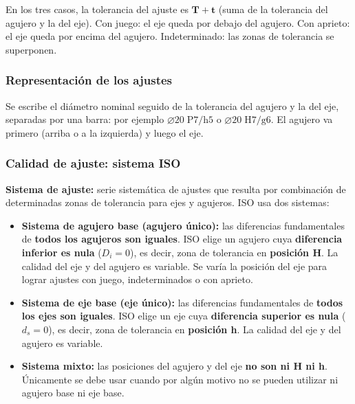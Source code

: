 \documentclass[12pt,a4paper]{article}
\begin{document}
\begin{aviso}
	En los tres casos, la tolerancia del ajuste es $\mathbf{T + t}$ (suma de la
	tolerancia del agujero y la del eje). Con juego: el eje queda por debajo del
	agujero. Con aprieto: el eje queda por encima del agujero. Indeterminado: las
	zonas de tolerancia se superponen.
\end{aviso}

\subsubsection{Representación de los ajustes}
Se escribe el diámetro nominal seguido de la tolerancia del agujero y la del
eje, separadas por una barra: por ejemplo
\textbf{$\varnothing 20\;\text{P7/h5}$} o \textbf{$\varnothing
		20\;\text{H7/g6}$}. El agujero va primero (arriba o a la izquierda) y luego
el eje.

\subsubsection{Calidad de ajuste: sistema ISO}
\textbf{Sistema de ajuste:} serie sistemática de ajustes que resulta por
combinación de determinadas zonas de tolerancia para ejes y agujeros. ISO usa
dos sistemas:

\begin{itemize}
	\item \textbf{Sistema de agujero base (agujero único):} las diferencias
	      fundamentales de \textbf{todos los agujeros son iguales}. ISO elige un
	      agujero
	      cuya \textbf{diferencia inferior es nula} ($D_i = 0$), es decir, zona de
	      tolerancia en \textbf{posición H}. La calidad del eje y del agujero es
	      variable.
	      Se varía la posición del eje para lograr ajustes con juego,
	      indeterminados o con
	      aprieto.
	\item \textbf{Sistema de eje base (eje único):} las diferencias fundamentales
	      de \textbf{todos los ejes son iguales}. ISO elige un eje cuya
	      \textbf{diferencia
		      superior es nula} ($d_s = 0$), es decir, zona de tolerancia en
	      \textbf{posición
		      h}. La calidad del eje y del agujero es variable.
	\item \textbf{Sistema mixto:} las posiciones del agujero y del eje \textbf{no
		      son ni H ni h}. Únicamente se debe usar cuando por algún motivo no se
	      pueden
	      utilizar ni agujero base ni eje base.
\end{itemize}
\end{document}
